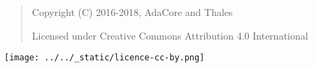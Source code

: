 \bigskip
\begin{quote}
   Copyright (C) 2016-2018, AdaCore and Thales

   Licensed under Creative Commons Attribution 4.0 International
\end{quote}

\texttt{[image: ../../\_static/licence-cc-by.png]}
\bigskip
